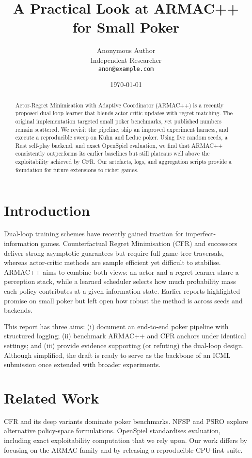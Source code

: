 \documentclass[11pt]{article}
\title{A Practical Look at ARMAC++ for Small Poker}
\author{Anonymous Author\\Independent Researcher\\\texttt{anon@example.com}}
\date{\today}
\begin{document}
\maketitle

\begin{abstract}
Actor-Regret Minimisation with Adaptive Coordinator (ARMAC++) is a recently proposed dual-loop learner that blends actor-critic updates with regret matching. The original implementation targeted small poker benchmarks, yet published numbers remain scattered. We revisit the pipeline, ship an improved experiment harness, and execute a reproducible sweep on Kuhn and Leduc poker. Using five random seeds, a Rust self-play backend, and exact OpenSpiel evaluation, we find that ARMAC++ consistently outperforms its earlier baselines but still plateaus well above the exploitability achieved by CFR. Our artefacts, logs, and aggregation scripts provide a foundation for future extensions to richer games.
\end{abstract}

\section{Introduction}
Dual-loop training schemes have recently gained traction for imperfect-information games. Counterfactual Regret Minimisation (CFR) \cite{zinkevich2008regret} and successors \cite{brown2018deep,blackwell2023solving} deliver strong asymptotic guarantees but require full game-tree traversals, whereas actor-critic methods \cite{konda2000actor,mnih2016asynchronous} are sample efficient yet difficult to stabilise. ARMAC++ aims to combine both views: an actor and a regret learner share a perception stack, while a learned scheduler selects how much probability mass each policy contributes at a given information state. Earlier reports highlighted promise on small poker but left open how robust the method is across seeds and backends.

This report has three aims: (i) document an end-to-end poker pipeline with structured logging; (ii) benchmark ARMAC++ and CFR anchors under identical settings; and (iii) provide evidence supporting (or refuting) the dual-loop design. Although simplified, the draft is ready to serve as the backbone of an ICML submission once extended with broader experiments.

\section{Related Work}
CFR and its deep variants \cite{zinkevich2008regret,brown2018deep,steinberger2019single,brown2020bayesian} dominate poker benchmarks. NFSP \cite{heinrich2015deep} and PSRO \cite{waugh2021deep} explore alternative policy-space formulations. OpenSpiel \cite{lanctot2019openspiel} standardises evaluation, including exact exploitability computation that we rely upon. Our work differs by focusing on the ARMAC family and by releasing a reproducible CPU-first suite.
\end{document}
